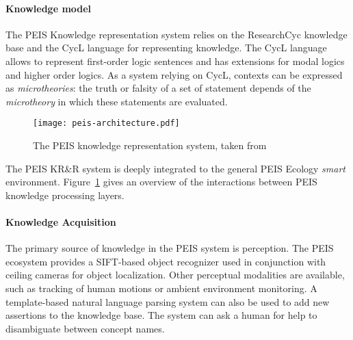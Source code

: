 \documentclass[journal]{IEEEtran}
\begin{document}

\paragraph{Knowledge model} The PEIS Knowledge representation system relies on
the {\sc ResearchCyc} knowledge base and the {\sc CycL} language for representing 
knowledge. The {\sc CycL} language allows to represent first-order logic 
sentences and has extensions for modal logics and higher order logics.
% 
% 
As a system relying on {\sc CycL}, contexts can be expressed as
\emph{microtheories}: the truth or falsity of a set of statement depends of the
\emph{microtheory} in which these statements are evaluated.
% 
% 
\begin{figure}
	\centering
	\texttt{[image: peis-architecture.pdf]}
	\caption{The PEIS knowledge representation system, taken from~\cite{Daoutis2009}}
	\label{fig|peis-archi}
\end{figure}
% 
The PEIS KR\&R system is deeply integrated to the general PEIS Ecology
\emph{smart} environment. Figure~\ref{fig|peis-archi} gives an overview of the
interactions between PEIS knowledge processing layers.

\paragraph{Knowledge Acquisition} The primary source of knowledge in the PEIS 
system is perception. The PEIS ecosystem provides a SIFT-based object recognizer 
used in conjunction with ceiling cameras for object localization.  Other 
perceptual modalities are available, such as tracking of human motions or 
ambient environment monitoring. A template-based natural language parsing 
system can also be used to add new assertions to the knowledge base. The 
system can ask a human for help to disambiguate between concept names.
\end{document}
